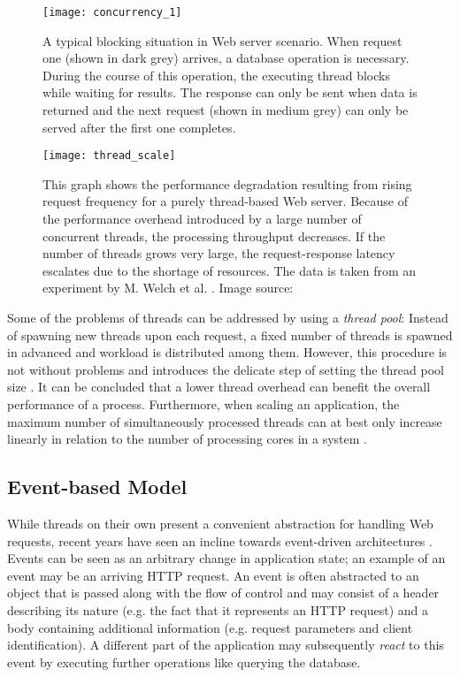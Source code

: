 \begin{figure}
\centering\small
\setlength{\tabcolsep}{0mm}
  \texttt{[image: concurrency\_1]}
\caption{
A typical blocking situation in Web server scenario. When request one (shown in dark grey) arrives, a database operation is necessary. During the course of this operation, the executing thread blocks while waiting for results. The response can only be sent when data is returned and the next request (shown in medium grey) can only be served after the first one completes.
}
\label{fig:concurrency_1}
\end{figure}

\begin{figure}
\centering\small
\setlength{\tabcolsep}{0mm}
  \texttt{[image: thread\_scale]}
\caption{
This graph shows the performance degradation resulting from rising request frequency for a purely thread-based Web server. Because of the performance overhead introduced by a large number of concurrent threads, the processing throughput decreases. If the number of threads grows very large, the request-response latency escalates due to the shortage of resources. The data is taken from an experiment by M. Welch et al. \cite{Welsh2001}. Image source: \cite{Welsh2001}
}
\label{fig:thread_scale}
\end{figure}

Some of the problems of threads can be addressed by using a \textit{thread pool}: Instead of spawning new threads upon each request, a fixed number of threads is spawned in advanced and workload is distributed among them. However, this procedure is not without problems and introduces the delicate step of setting the thread pool size \cite{threadpools}. It can be concluded that a lower thread overhead can benefit the overall performance of a process. Furthermore, when scaling an application, the maximum number of simultaneously processed threads can at best only increase linearly in relation to the number of processing cores in a system \cite{McCool}.

\subsection{Event-based Model}
\label{lab:events}
While threads on their own present a convenient abstraction for handling Web requests, recent years have seen an incline towards event-driven architectures \cite{Tilkov2010}. Events can be seen as an arbitrary change in application state; an example of an event may be an arriving HTTP request. An event is often abstracted to an object that is passed along with the flow of control and may consist of a header describing its nature (e.g. the fact that it represents an HTTP request) and a body containing additional information (e.g. request parameters and client identification). A different part of the application may subsequently \textit{react} to this event by executing further operations like querying the database.


